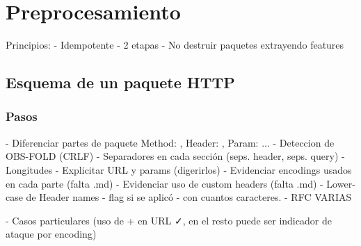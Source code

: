 \documentclass{prgrado}
\begin{document}



\section{Preprocesamiento}

Principios:
- Idempotente
- 2 etapas
- No destruir paquetes extrayendo features

\subsection{Esquema de un paquete HTTP}

\subsubsection{Pasos}
- Diferenciar partes de paquete
    Method: , Header: , Param: ...
- Deteccion de OBS-FOLD (CRLF)
- Separadores en cada sección (seps. header, seps. query)
- Longitudes
- Explicitar URL y params (digerirlos)
- Evidenciar encodings usados en cada parte (falta .md)
- Evidenciar uso de custom headers (falta .md)
- Lower-case de Header names - flag si se aplicó - con cuantos caracteres.
- RFC VARIAS

- Casos particulares (uso de + en URL ✓, en el resto puede ser indicador de ataque por encoding)
\end{document}

